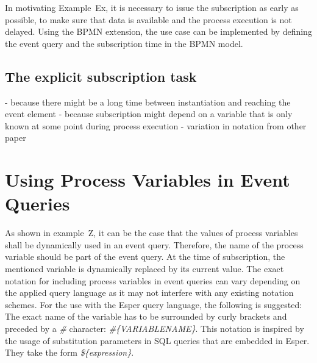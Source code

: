 In motivating Example~Ex, it is necessary to issue the subscription as early as possible, to make sure that data is available and the process execution is not delayed. 
Using the BPMN extension, the use case can be implemented by defining the event query and the subscription time in the BPMN model. 

\subsection{The explicit subscription task}





- because there might be a long time between instantiation and reaching the event element
- because subscription might depend on a variable that is only known at some point during process execution
- variation in notation from other paper

\section{Using Process Variables in Event Queries}



As shown in example~Z, it can be the case that the values of process variables shall be dynamically used in an event query.
Therefore, the name of the process variable should be part of the event query. At the time of subscription, the mentioned variable is dynamically replaced by its current value.
The exact notation for including process variables in event queries can vary depending on the applied query language as it may not interfere with any existing notation schemes.
For the use with the Esper query language, the following is suggested: The exact name of the variable has to be surrounded by curly brackets and preceded by a \textit{\#} character: \textit{\#\{VARIABLENAME\}}.
This notation is inspired by the usage of substitution parameters in SQL queries that are embedded in Esper. They take the form \textit{\$\{expression\}}.


